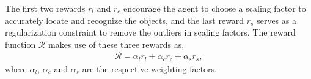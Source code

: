 \documentclass[letterpaper]{article} %
\newcommand\rjf[1]{\textcolor{red}{\{RJF: #1\}}}
\newcommand\yxy[1]{\textcolor{blue}{\{YXY: #1\}}}
\begin{document}


The first two rewards $r_l$ and $r_c$ encourage the agent to choose a scaling factor to accurately locate and recognize the objects, and the last reward $r_s$ serves as a regularization constraint to remove the outliers in scaling factors. The reward function $\mathcal{R}$ makes use of these three rewards as, 
\begin{align}
\label{equ:rewardFunction}
\mathcal{R} = \alpha_l r_l +\alpha_c r_c + \alpha_s r_s, 
\end{align}
where $\alpha_l$, $\alpha_c$ and $\alpha_s$ are the respective weighting factors. %
\end{document}
